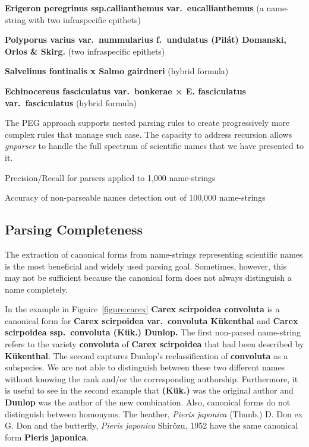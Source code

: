 \documentclass{bmcart}
\begin{document}
\vspace{0.5cm}

\textbf{Erigeron peregrinus ssp.callianthemus var.\ eucallianthemus} (a name-string with two infraspecific epithets)

\textbf{Polyporus varius var.\ nummularius f.\ undulatus (Pilát) Domanski, Orlos \& Skirg.} (two infraspecific epithets)

\textbf{Salvelinus fontinalis x Salmo gairdneri} (hybrid formula)

\textbf{Echinocereus fasciculatus var.\ bonkerae × E. fasciculatus var.\ fasciculatus} (hybrid formula)


\vspace{0.5cm}

The PEG approach supports nested parsing rules to create progressively more complex rules that manage such case. The capacity to address recursion allows \textit{gnparser} to handle the full spectrum of scientific names that we have presented to it.

\begin{table}[htb]
  \begin{center}
    \caption{Precision/Recall for parsers applied to 1,000
    name-strings}\label{table:precision}
  \end{center}
\end{table}

\begin{table}[htb]
  \begin{center}
    \caption{Accuracy of non-parseable names detection out of 100,000
    name-strings}\label{table:unparsed}
  \end{center}
\end{table}

\subsection*{Parsing Completeness}

The extraction of canonical forms from name-strings representing scientific names is the most beneficial and widely used parsing goal. Sometimes, however, this may not be sufficient because the canonical form does not always distinguish a name completely.

In the example in Figuire~\ref{figure:carex} \textbf{Carex scirpoidea convoluta} is a canonical form for \textbf{Carex scirpoidea var.\ convoluta Kükenthal} and \textbf{Carex scirpoidea ssp.\ convoluta (Kük.) Dunlop.} The first non-parsed name-string refers to the variety \textbf{convoluta} of \textbf{Carex scirpoidea} that had been described by \textbf{Kükenthal}. The second captures Dunlop's reclassification of \textbf{convoluta} as a subspecies. We are not able to distinguish between these two different names without knowing the rank and/or the corresponding authorship. Furthermore, it is useful to see in the second example that \textbf{(Kük.)} was the original author and \textbf{Dunlop} was the author of the new combination. Also, canonical forms do not distinguish between homonyms. The heather,  \textit{Pieris japonica} (Thunb.) D. Don ex G. Don and the butterfly, \textit{Pieris japonica} Shirôzu, 1952 have the same canonical form \textbf{Pieris japonica}.
\end{document}
